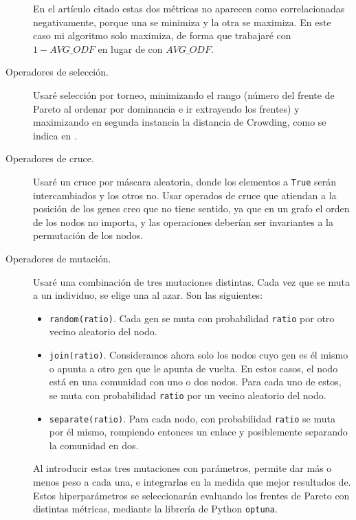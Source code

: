 \begin{description}
    En el artículo citado estas dos métricas no aparecen como correlacionadas negativamente,
    porque una se minimiza y la otra se maximiza. En este caso mi algoritmo solo maximiza,
    de forma que trabajaré con \(1 - AVG\_ODF\) en lugar de con \(AVG\_ODF\).

  \item[Operadores de selección.] Usaré selección por torneo, minimizando el rango (número
    del frente de Pareto al ordenar por dominancia e ir extrayendo los frentes) y maximizando
    en segunda instancia la distancia de Crowding, como se indica en \cite{deb2002fastelitist}.

  \item[Operadores de cruce.] Usaré un cruce por máscara aleatoria, donde los elementos
    a \lstinline{True} serán intercambiados y los otros no. Usar operados de cruce que
    atiendan a la posición de los genes creo que no tiene sentido, ya que en un grafo el
    orden de los nodos no importa, y las operaciones deberían ser invariantes a la
    permutación de los nodos.

  \item[Operadores de mutación.] Usaré una combinación de tres mutaciones distintas. Cada
    vez que se muta a un individuo, se elige una al azar. Son las siguientes:
    \begin{itemize}
      \item \lstinline{random(ratio)}. Cada gen se muta con probabilidad
        \lstinline{ratio} por otro vecino aleatorio del nodo.

      \item \lstinline{join(ratio)}. Consideramos ahora solo los nodos cuyo gen
        es él mismo o apunta a otro gen que le apunta de vuelta. En estos casos,
        el nodo está en una comunidad con uno o dos nodos. Para cada uno
        de estos, se muta con probabilidad \lstinline{ratio} por un vecino
        aleatorio del nodo.

      \item \lstinline{separate(ratio)}. Para cada nodo, con probabilidad
        \lstinline{ratio} se muta por él mismo, rompiendo entonces un enlace
        y posiblemente separando la comunidad en dos.
    \end{itemize}

    Al introducir estas tres mutaciones con parámetros, permite dar más o menos
    peso a cada una, e integrarlas en la medida que mejor resultados de. Estos
    hiperparámetros se seleccionarán evaluando los frentes de Pareto con distintas
    métricas, mediante la librería de Python \lstinline{optuna}.
\end{description}

